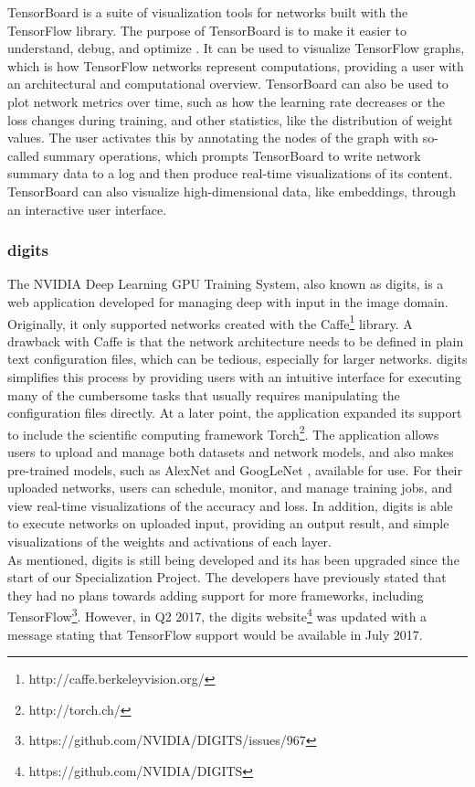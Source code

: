 TensorBoard is a suite of visualization tools for networks built with the TensorFlow library. The purpose of TensorBoard is to make it easier to understand, debug, and optimize . It can be used to visualize TensorFlow graphs, which is how TensorFlow networks represent computations, providing a user with an architectural and computational overview. TensorBoard can also be used to plot network metrics over time, such as how the learning rate decreases or the loss changes during training, and other statistics, like the distribution of weight values. The user activates this by annotating the nodes of the graph with so-called summary operations, which prompts TensorBoard to write network summary data to a log and then produce real-time visualizations of its content. TensorBoard can also visualize high-dimensional data, like embeddings, through an interactive user interface.

\subsubsection{\acrshort{digits}}

The NVIDIA Deep Learning GPU Training System, also known as \acrshort{digits}, is a web application developed for managing deep  with input in the image domain. Originally, it only supported networks created with the Caffe\footnote{http://caffe.berkeleyvision.org/} library. A drawback with Caffe is that the network architecture needs to be defined in plain text configuration files, which can be tedious, especially for larger networks. \acrshort{digits} simplifies this process by providing users with an intuitive interface for executing many of the cumbersome tasks that usually requires manipulating the configuration files directly. At a later point, the application expanded its support to include the scientific computing framework Torch\footnote{http://torch.ch/}. The application allows users to upload and manage both datasets and network models, and also makes pre-trained models, such as AlexNet \cite{alexnet} and GoogLeNet \cite{googlenet}, available for use. For their uploaded networks, users can schedule, monitor, and manage training jobs, and view real-time visualizations of the accuracy and loss. In addition, \acrshort{digits} is able to execute networks on uploaded input, providing an output result, and simple visualizations of the weights and activations of each layer. \\

\noindent As mentioned, \acrshort{digits} is still being developed and its has been upgraded since the start of our Specialization Project. The developers have previously stated that they had no plans towards adding support for more frameworks, including TensorFlow\footnote{https://github.com/NVIDIA/DIGITS/issues/967}. However, in Q2 2017, the \acrshort{digits} website\footnote{https://github.com/NVIDIA/DIGITS} was updated with a message stating that TensorFlow support would be available in July 2017.


